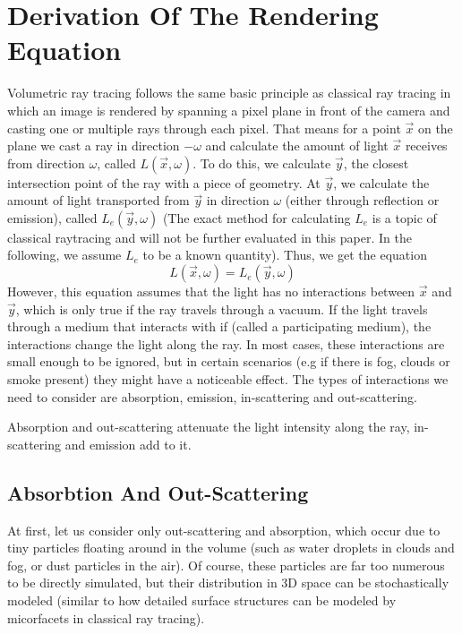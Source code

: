 \section{Derivation Of The Rendering Equation}
Volumetric ray tracing follows the same basic principle as classical ray tracing in which an image is rendered by spanning a pixel plane in front of the camera and casting one or multiple rays through each pixel.
That means for a point $\vec{x}$ on the plane we cast a ray in direction $-\omega$ and calculate the amount of light $\vec{x}$ receives from direction $\omega$, called $L(\vec{x},\omega )$.
To do this, we calculate $\vec{y}$, the closest intersection point of the ray with a piece of geometry. At $\vec{y}$, we calculate the amount of light transported from $\vec{y}$ in direction $\omega$ (either through reflection or emission), called $L_e(\vec{y},\omega )$ (The exact method for calculating $L_e$ is a topic of classical raytracing and will not be further evaluated in this paper. In the following, we assume $L_e$ to be a known quantity).
Thus, we get the equation 
\begin{equation}
L(\vec{x},\omega ) = L_e(\vec{y}, \omega )
\end{equation}
However, this equation assumes that the light has no interactions between $\vec{x}$ and $\vec{y}$, which is only true if the ray travels through a vacuum. If the light travels through a medium that interacts with if (called a participating medium), the interactions change the light along the ray. In most cases, these interactions are small enough to be ignored, but in certain scenarios (e.g if there is fog, clouds or smoke present) they might have a noticeable effect. The types of interactions we need to consider are absorption, emission, in-scattering and out-scattering.

Absorption and out-scattering attenuate the light intensity along the ray, in-scattering and emission add to it.
\subsection{Absorbtion And Out-Scattering}
At first, let us consider only out-scattering and absorption, which occur due to tiny particles floating around in the volume (such as water droplets in clouds and fog, or dust particles in the air).
Of course, these particles are far too numerous to be directly simulated, but their distribution in 3D space can be stochastically modeled (similar to how detailed surface structures can be modeled by micorfacets in classical ray tracing).

